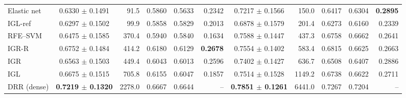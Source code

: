 \begin{table}[t]
\begin{tabular}{@{}lcrrrrcrrrr@{}}
Elastic net & 0.6330 $\pm$ 0.1491 & 91.5 & 0.5860 & 0.5633 & 0.2342 & 0.7217 $\pm$ 0.1566 & 150.0 & 0.6417 & 0.6304 & \textbf{0.2895} \\
IGL-ref & 0.6297 $\pm$ 0.1502 & 99.9 & 0.5858 & 0.5829 & 0.2013 & 0.6878 $\pm$ 0.1579 & 201.4 & 0.6273 & 0.6160 & 0.2339 \\
RFE--SVM & 0.6475 $\pm$ 0.1585 & 370.4 & 0.5940 & 0.5840 & 0.1634 & 0.7588 $\pm$ 0.1447 & 437.3 & 0.6758 & 0.6662 & 0.2641 \\
IGR-R & 0.6752 $\pm$ 0.1484 & 414.2 & 0.6180 & 0.6129 & \textbf{0.2678} & 0.7554 $\pm$ 0.1402 & 583.4 & 0.6815 & 0.6625 & 0.2663 \\
IGR & 0.6563 $\pm$ 0.1503 & 449.4 & 0.6043 & 0.6013 & 0.2596 & 0.7402 $\pm$ 0.1427 & 636.7 & 0.6508 & 0.6407 & 0.2886 \\
IGL & 0.6675 $\pm$ 0.1515 & 705.8 & 0.6155 & 0.6047 & 0.1857 & 0.7514 $\pm$ 0.1528 & 1149.2 & 0.6738 & 0.6622 & 0.2711 \\
DRR (dense) & \textbf{0.7219 $\pm$ 0.1320} & 2278.0 & 0.6667 & 0.6644 & -- & \textbf{0.7851 $\pm$ 0.1261} & 6441.0 & 0.7267 & 0.7204 & -- \\
\bottomrule
\end{tabular}
\end{table}
